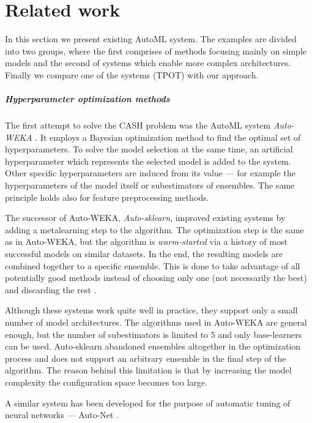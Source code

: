 \chapter{Related work} \label{ch2:related}
In this section we present existing AutoML system. The examples are divided into
two groups, where the first comprises of methods focusing mainly on simple
models and the second of systems which enable more complex architectures.
Finally we compare one of the systems (TPOT) with our approach.

\paragraph{Hyperparameter optimization methods} \label{CASH}
The first attempt to solve the CASH problem was the AutoML system \emph{Auto-WEKA}
\citep{DBLP:journals/corr/abs-1208-3719}. It employs a Bayesian optimization
method to find the optimal set of hyperparameters. To solve the model selection
at the same time, an artificial hyperparameter which represents the selected
model is added to the system. Other specific hyperparameters are induced from its
value --- for example the hyperparameters of the model itself or subestimators of
ensembles. The same principle holds also for feature preprocessing methods.

The successor of Auto-WEKA, \emph{Auto-sklearn}, improved existing systems by
adding a metalearning step to the algorithm. The optimization step is the same
as in Auto-WEKA, but the algorithm is \emph{warm-started} via a history of most
successful models on similar datasets. In the end, the resulting models are
combined together to a specific ensemble. This is done to take advantage of all
potentially good methods instead of choosing only one (not necessarily the best)
and discarding the rest \citep{Feurer:2015:ERA:2969442.2969547}.

Although these systems work quite well in practice, they support only a small
number of model architectures. The algorithms used in Auto-WEKA are general
enough, but the number of subestimators is limited to 5 and only base-learners can
be used. Auto-sklearn abandoned ensembles altogether in the optimization process
and does not support an arbitrary ensemble in the final step of the algorithm.
The reason behind this limitation is that by increasing the model complexity the
configuration space becomes too large.

A similar system has been developed for the purpose of automatic tuning of neural
networks --- Auto-Net \citep{pmlr-v64-mendoza_towards_2016}.

